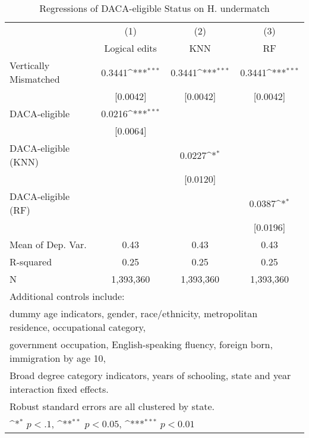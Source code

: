 \begin{table}[htbp]\centering
\def\sym#1{\ifmmode^{#1}\else\(^{#1}\)\fi}
\caption{Regressions of DACA-eligible Status on H. undermatch}
\begin{tabular}{l*{3}{c}}
\toprule
                    &\multicolumn{1}{c}{(1)}         &\multicolumn{1}{c}{(2)}         &\multicolumn{1}{c}{(3)}         \\
                    &Logical edits         &         KNN         &          RF         \\
\midrule
Vertically Mismatched&      0.3441\sym{***}&      0.3441\sym{***}&      0.3441\sym{***}\\
                    &    [0.0042]         &    [0.0042]         &    [0.0042]         \\
\addlinespace
DACA-eligible       &      0.0216\sym{***}&                     &                     \\
                    &    [0.0064]         &                     &                     \\
\addlinespace
DACA-eligible (KNN) &                     &      0.0227\sym{*}  &                     \\
                    &                     &    [0.0120]         &                     \\
\addlinespace
DACA-eligible (RF)  &                     &                     &      0.0387\sym{*}  \\
                    &                     &                     &    [0.0196]         \\
\midrule
Mean of Dep. Var.   &        0.43         &        0.43         &        0.43         \\
R-squared           &        0.25         &        0.25         &        0.25         \\
N                   &   1,393,360         &   1,393,360         &   1,393,360         \\
\bottomrule
\multicolumn{4}{l}{\footnotesize Additional controls include:}\\
\multicolumn{4}{l}{\footnotesize dummy age indicators, gender, race/ethnicity, metropolitan residence, occupational category,}\\
\multicolumn{4}{l}{\footnotesize government occupation, English-speaking fluency, foreign born, immigration by age 10,}\\
\multicolumn{4}{l}{\footnotesize Broad degree category indicators, years of schooling, state and year interaction fixed effects.}\\
\multicolumn{4}{l}{\footnotesize Robust standard errors are all clustered by state.}\\
\multicolumn{4}{l}{\footnotesize \sym{*} \(p<.1\), \sym{**} \(p<0.05\), \sym{***} \(p<0.01\)}\\
\end{tabular}
\end{table}
